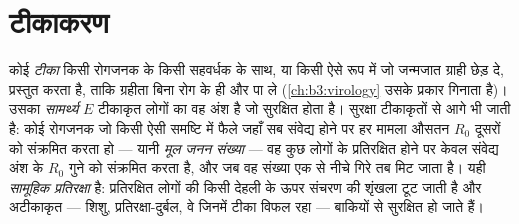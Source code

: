 \section{टीकाकरण}

\begin{definition}[टीके और सामूहिक प्रतिरक्षा]\label{def:b3:adaptive-immunity:vaccine}
कोई \emph{टीका} किसी रोगजनक के  किसी सहवर्धक के साथ, या किसी
ऐसे रूप में जो जन्मजात ग्राही छेड़ दे, प्रस्तुत करता है, ताकि ग्रहीता
बिना रोग के ही  और  पा ले
(\cref{ch:b3:virology} उसके प्रकार गिनाता है)। उसका \emph{सामर्थ्य}
$E$ टीकाकृत लोगों का वह अंश है जो सुरक्षित होता है। सुरक्षा टीकाकृतों से
आगे भी जाती है: कोई रोगजनक जो किसी ऐसी समष्टि में फैले जहाँ सब संवेद्य
होने पर हर मामला औसतन $R_{0}$ दूसरों को संक्रमित करता हो --- यानी
\emph{मूल जनन संख्या} --- वह कुछ लोगों के प्रतिरक्षित होने पर केवल
संवेद्य अंश के $R_{0}$ गुने को संक्रमित करता है, और जब वह संख्या एक से
नीचे गिरे तब मिट जाता है। यही \emph{सामूहिक प्रतिरक्षा} है: प्रतिरक्षित
लोगों की किसी देहली के ऊपर संचरण की शृंखला टूट जाती है और अटीकाकृत ---
शिशु, प्रतिरक्षा-दुर्बल, वे जिनमें टीका विफल रहा --- बाकियों से
सुरक्षित हो जाते हैं।
\end{definition}

